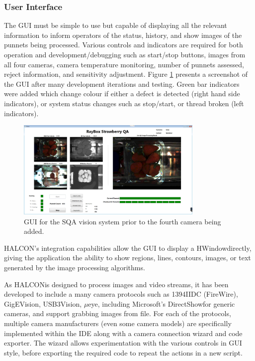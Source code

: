 \documentclass[fleqn,twoside,12pt]{report}
\begin{document}
\subsubsection{User Interface}

The GUI must be simple to use but capable of displaying all the relevant information to inform operators of the status, history, and show images of the punnets being processed. Various controls and indicators are required for both operation and development/debugging such as start/stop buttons, images from all four cameras, camera temperature monitoring, number of punnets assessed, reject information, and sensitivity adjustment. Figure \ref{fig:GUI} presents a screenshot of the GUI after many development iterations and testing. Green bar indicators were added which change colour if either a defect is detected (right hand side indicators), or system status changes such as stop/start, or thread broken (left indicators).  


\begin{figure}[h]
	\centering
	\includegraphics[width=0.8\textwidth]{GUI.png}
	\caption{GUI for the SQA vision system prior to the fourth camera being added.}
	\label{fig:GUI}
\end{figure}
  
  
HALCON\texttrademark's integration capabilities allow the GUI to display a HWindow\texttrademark directly, giving the application the ability to show regions, lines, contours, images, or text generated by the image processing algorithms. 

As HALCON\texttrademark is designed to process images and video streams, it has been developed to include a many camera protocols such as 1394IIDC (FireWire\texttrademark), GigEVision\textregistered, USB3Vision\textregistered, $\mu$eye\texttrademark, including Microsoft\textregistered's DirectShow\textregistered for generic cameras, and support grabbing images from file. For each of the protocols, multiple camera manufacturers (even some camera models) are specifically implemented within the IDE along with a camera connection wizard and code exporter. The wizard allows experimentation with the various controls in GUI style, before exporting the required code to repeat the actions in a new script. 
\end{document}
